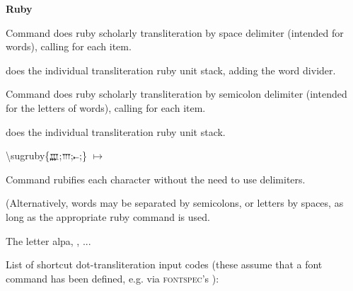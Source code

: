 \documentclass{article}
\begin{document}
\bigskip\textbf{Ruby}

Command \cs{\sugrubyw} does ruby scholarly transliteration by space delimiter (intended for words), calling \cs{\smaprubyw} for each item.

\cs{\smaprubyw} does the individual transliteration ruby unit stack, adding the word divider.



\bigskip
Command \cs{\sugruby} does ruby scholarly transliteration by semicolon delimiter (intended for the letters of words), calling \cs{\smapruby} for each item.

\cs{\smapruby} does the individual transliteration ruby unit stack.

{\ttfamily\color{blue}\textbackslash sugruby\{{\ugfont\scriptsize 𐎄};{\ugfont\scriptsize 𐎍};{\ugfont\scriptsize 𐎚};\}}
\enspace$\mapsto$\enspace
{}



\bigskip
Command \cs{\sugrubynd} rubifies each character without the need to use delimiters.

\bigskip
{}

%
%
%

\bigskip
(Alternatively, words may be separated by semicolons, or letters by spaces, as long as the appropriate ruby command is used.

\bigskip
The letter alpa, , ...

\bigskip
List of shortcut dot-transliteration input codes (these assume that a font command \cs{\ugfont} has been defined, e.g. via \textsc{fontspec}'s ):
\end{document}
